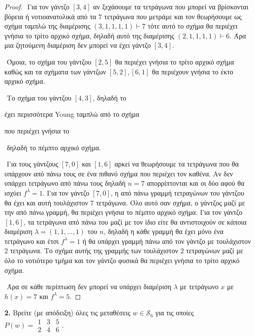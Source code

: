 \documentclass[oneside,a4paper]{article}
\newcommand {\tl}{\textlatin}
\begin{document}
\begin{proof}
    $ $\newline
    Για τον γάντζο $[3,4]$ αν ξεχάσουμε τα τετράγωνα που μπορεί να βρίσκονται βόρεια ή νοτιοανατολικά από τα $7$ τετράγωνα που μετράμε και τον θεωρήσουμε ως σχήμα ταμπλώ της διαμέρισης $(3,1,1,1,1) \vdash 7$ τότε αυτό το σχήμα θα περιέχει γνήσια το τρίτο αρχικό σχήμα, δηλαδή αυτό της διαμέρισης $(2,1,1,1,1) \vdash 6$. Άρα μια ζητούμενη διαμέριση δεν μπορεί να έχει γάντζο $[3,4]$.
    
    $ $\newline
    Όμοια, το σχήμα του γάντζου $[2,5]$ θα περιέχει γνήσια το τρίτο αρχικό σχήμα καθώς και τα σχήματα των γάντζων $[5,2], [6,1]$ θα περιέχουν γνήσια το έκτο αρχικό σχήμα.

    $ $\newline
    Το σχήμα του γάντζου $[4,3]$, δηλαδή το 
    \vspace*{0.1cm}
    \begin{center} \end{center}
    έχει περισσότερα \tl{Young} ταμπλώ από το σχήμα 
    \vspace*{0.1cm}
    \begin{center} \quad που περιέχει γνήσια το \quad {} \end{center}

    $ $\newline
    δηλαδή το πέμπτο αρχικό σχήμα.

    $ $\newline
    Για τους γάντζους $[7,0]$ και $[1,6]$ αρκεί να θεωρήσουμε τα τετράγωνα που θα υπάρχουν από πάνω τους σε ένα πιθανό σχήμα που περιέχει τον καθένα. Αν δεν υπάρχει τετράγωνο από πάνω τους δηλαδή $n=7$ απορρίπτονται και οι δύο αφού θα ισχύει $f^{\lambda} = 1$. Για τον γάντζο $[7,0]$, η από πάνω γραμμή τετραγώνων του γάντζου θα έχει και αυτή τουλάχιστον $7$ τετράγωνα. Όλο αυτό σαν σχήμα, ο γάντζος μαζί με την από πάνω γραμμή, θα περιέχει γνήσια το πέμπτο αρχικό σχήμα. Για τον γάντζο $[1,6]$, τα τετράγωνα από πάνω του μαζί με τον ίδιο είτε θα αντιστοιχούν σε κάποια διαμέριση $\lambda  = (1,1,\ldots,1)$ του $n$, δηλαδή η κάθε γραμμή θα έχει μόνο ένα τετράγωνο και έτσι $f^{\lambda} = 1$ ή θα υπάρχει γραμμή πάνω από τον γάντζο με τουλάχιστον $2$ τετράγωνα. Το σχήμα αυτής της γραμμής των τουλάχιστον $2$ τετραγώνων μαζί με όλο το νοτιότερο τμήμα και τον γάντζο φυσικά θα περιέχει γνήσια το τρίτο αρχικό σχήμα.
    
    
    $ $\newline
    Άρα σε κάθε περίπτωση δεν μπορεί να υπάρχει διαμέριση $\lambda$ με τετράγωνο $x$ με $h(x)= 7$ και $f^{\lambda} = 5$.
\end{proof}
\pagebreak
\noindent \textbf{2. } Βρείτε (με απόδειξη) όλες τις μεταθέσεις $w \in \mathcal{S}_6$ για τις οποίες $P(w) = \begin{matrix} 1 & 3 & 5 \\ 2 & 4 & 6 \end{matrix}$. 
\end{document}
